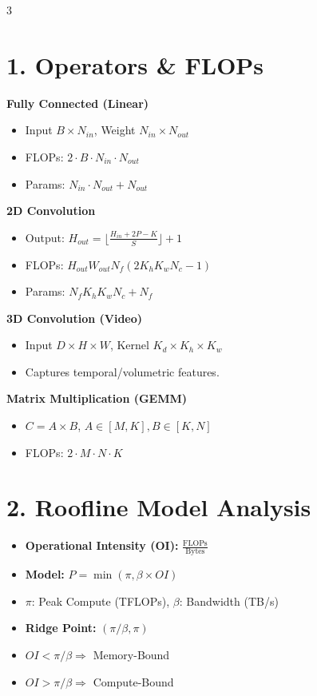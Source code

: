 \documentclass[8pt, a4paper, landscape]{article}
\begin{document}
\pagestyle{empty}
\footnotesize

\begin{multicols*}{3}

\section{1. Operators \& FLOPs}
\textbf{Fully Connected (Linear)}
\begin{itemize}
    \item Input $B \times N_{in}$, Weight $N_{in} \times N_{out}$
    \item FLOPs: $2 \cdot B \cdot N_{in} \cdot N_{out}$
    \item Params: $N_{in} \cdot N_{out} + N_{out}$
\end{itemize}

\textbf{2D Convolution}
\begin{itemize}
    \item Output: $H_{out} = \lfloor \frac{H_{in} + 2P - K}{S} \rfloor + 1$
    \item FLOPs: $H_{out} W_{out} N_f (2 K_h K_w N_c - 1)$
    \item Params: $N_f K_h K_w N_c + N_f$
\end{itemize}

\textbf{3D Convolution (Video)}
\begin{itemize}
    \item Input $D \times H \times W$, Kernel $K_d \times K_h \times K_w$
    \item Captures temporal/volumetric features.
\end{itemize}

\textbf{Matrix Multiplication (GEMM)}
\begin{itemize}
    \item $C = A \times B$, $A \in [M, K], B \in [K, N]$
    \item FLOPs: $2 \cdot M \cdot N \cdot K$
\end{itemize}

\section{2. Roofline Model Analysis}
\begin{itemize}
    \item \textbf{Operational Intensity (OI):} $\frac{\text{FLOPs}}{\text{Bytes}}$
    \item \textbf{Model:} $P = \min(\pi, \beta \times OI)$
    \item $\pi$: Peak Compute (TFLOPs), $\beta$: Bandwidth (TB/s)
    \item \textbf{Ridge Point:} $(\pi/\beta, \pi)$
    \item $OI < \pi/\beta \Rightarrow$ Memory-Bound
    \item $OI > \pi/\beta \Rightarrow$ Compute-Bound
\end{itemize}


\end{multicols*}
\end{document}

